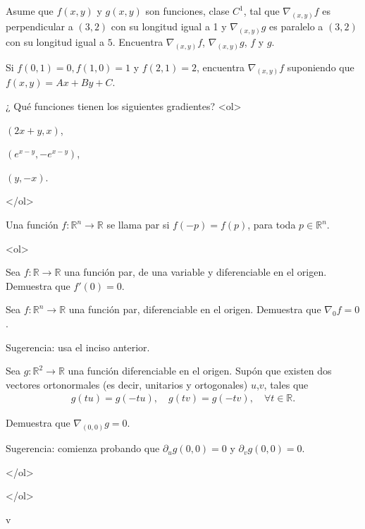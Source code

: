 \documentclass{article}
\theoremstyle{definition}
\begin{document}
\item Asume que $f(x,y)$ y $g(x,y)$ son   funciones, clase $C^1$, tal que
  $\nabla_{(x,y)} f$ es perpendicular a $(3,2)$ con su longitud
  igual a 1 y $\nabla_{(x,y)}g$ es paralelo a $(3,2)$
  con su longitud igual a $5$. Encuentra $\nabla_{(x,y)}f$,
  $\nabla_{(x,y)}g$, $f$ y $g$.

\item Si $f(0,1)=0, f(1,0)=1$ y $f(2,1)=2$, encuentra
  $\nabla_{(x,y)}f$ suponiendo que $f(x,y)=Ax+By+C$.

\item ¿ Qué funciones tienen los siguientes
  gradientes?
  <ol>
  \item $(2x+y,x)$,
  \item $(e^{x-y},-e^{x-y})$,
  \item $(y,-x)$.
    
  </ol>
  


         \item Una función $f:\mathbb{R}^n \to \mathbb{R}$ se llama par si
           $f(-p)=f(p)$, para toda $p\in \mathbb{R}^n$.

           <ol>
         
           \item Sea $f:\mathbb{R} \to \mathbb{R}$ una función par, de una variable
             y diferenciable en el origen. Demuestra que $f'(0)=0$. 


           \item Sea $f:\mathbb{R}^n \to \mathbb{R}$ una función par,
             diferenciable en el origen. Demuestra que $\nabla_{0}f=0$.

             Sugerencia: usa el inciso anterior.
             
           \item Sea $g:\mathbb{R}^2\to \mathbb{R}$ una función diferenciable en
             el origen. Supón que existen dos vectores ortonormales (es decir,
             unitarios y ortogonales) $u$,$v$, tales que
             \begin{eqnarray*}
               g(tu)=g(-tu), \quad g(tv)=g(-tv),\quad \forall t\in \mathbb{R}. 
             \end{eqnarray*}

             Demuestra que $\nabla_{(0,0)}g=0$.
             
             Sugerencia: comienza probando que   $\partial_ug(0,0)=0$ y $\partial_{v}g(0,0)=0$. 

           </ol>

  
  </ol>


v  
       
\end{document}
